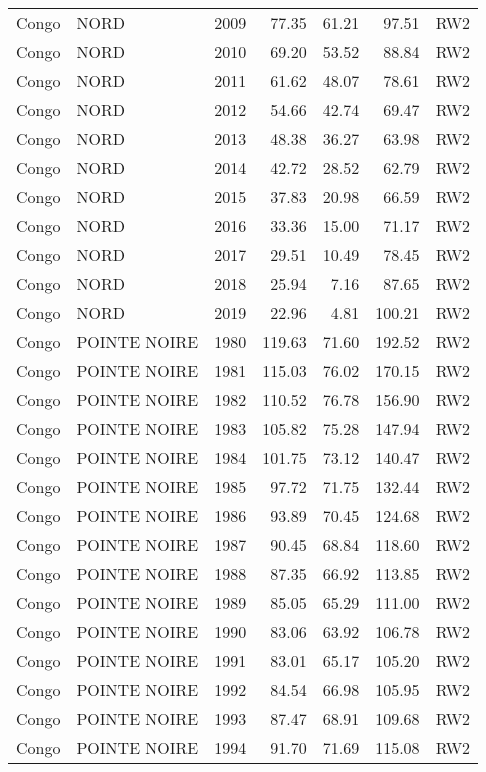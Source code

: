 \begin{longtable}{lllrrrl}
  Congo & NORD & 2009 & 77.35 & 61.21 & 97.51 & RW2 \\ 
  Congo & NORD & 2010 & 69.20 & 53.52 & 88.84 & RW2 \\ 
  Congo & NORD & 2011 & 61.62 & 48.07 & 78.61 & RW2 \\ 
  Congo & NORD & 2012 & 54.66 & 42.74 & 69.47 & RW2 \\ 
  Congo & NORD & 2013 & 48.38 & 36.27 & 63.98 & RW2 \\ 
  Congo & NORD & 2014 & 42.72 & 28.52 & 62.79 & RW2 \\ 
  Congo & NORD & 2015 & 37.83 & 20.98 & 66.59 & RW2 \\ 
  Congo & NORD & 2016 & 33.36 & 15.00 & 71.17 & RW2 \\ 
  Congo & NORD & 2017 & 29.51 & 10.49 & 78.45 & RW2 \\ 
  Congo & NORD & 2018 & 25.94 & 7.16 & 87.65 & RW2 \\ 
  Congo & NORD & 2019 & 22.96 & 4.81 & 100.21 & RW2 \\ 
  Congo & POINTE NOIRE & 1980 & 119.63 & 71.60 & 192.52 & RW2 \\ 
  Congo & POINTE NOIRE & 1981 & 115.03 & 76.02 & 170.15 & RW2 \\ 
  Congo & POINTE NOIRE & 1982 & 110.52 & 76.78 & 156.90 & RW2 \\ 
  Congo & POINTE NOIRE & 1983 & 105.82 & 75.28 & 147.94 & RW2 \\ 
  Congo & POINTE NOIRE & 1984 & 101.75 & 73.12 & 140.47 & RW2 \\ 
  Congo & POINTE NOIRE & 1985 & 97.72 & 71.75 & 132.44 & RW2 \\ 
  Congo & POINTE NOIRE & 1986 & 93.89 & 70.45 & 124.68 & RW2 \\ 
  Congo & POINTE NOIRE & 1987 & 90.45 & 68.84 & 118.60 & RW2 \\ 
  Congo & POINTE NOIRE & 1988 & 87.35 & 66.92 & 113.85 & RW2 \\ 
  Congo & POINTE NOIRE & 1989 & 85.05 & 65.29 & 111.00 & RW2 \\ 
  Congo & POINTE NOIRE & 1990 & 83.06 & 63.92 & 106.78 & RW2 \\ 
  Congo & POINTE NOIRE & 1991 & 83.01 & 65.17 & 105.20 & RW2 \\ 
  Congo & POINTE NOIRE & 1992 & 84.54 & 66.98 & 105.95 & RW2 \\ 
  Congo & POINTE NOIRE & 1993 & 87.47 & 68.91 & 109.68 & RW2 \\ 
  Congo & POINTE NOIRE & 1994 & 91.70 & 71.69 & 115.08 & RW2 \\ 

\end{longtable}
